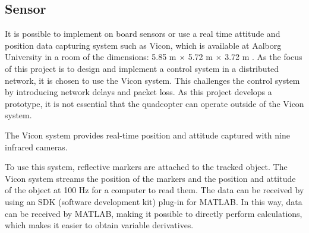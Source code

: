 \subsection{Sensor}
It is possible to implement on board sensors or use a real time attitude and position data capturing system such as Vicon, which is available at Aalborg University in a room of the dimensions: 5.85 m $\times$ 5.72 m $\times$ 3.72 m .
As the focus of this project is to design and implement a control system in a distributed network, it is chosen to use the Vicon system. This challenges the control system by introducing network delays and packet loss. As this project develops a prototype, it is not essential that the quadcopter can operate outside of the Vicon system.

The Vicon system provides real-time position and attitude captured with nine infrared cameras.
%

To use this system, reflective markers are attached to the tracked object. The Vicon system streams the position of the markers and the position and attitude of the object at 100 Hz for a computer to read them\cite{ViconDataSTream}. The data can be received by using an SDK (software development kit) plug-in for MATLAB. In this way, data can be received by MATLAB, making it possible to directly perform calculations, which makes it easier to obtain variable derivatives.

